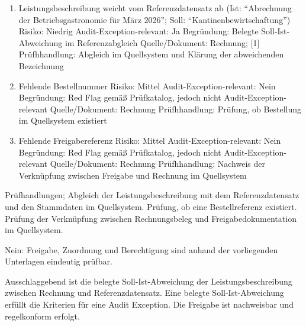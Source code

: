 \begin{enumerate}
    \item Leistungsbeschreibung weicht vom Referenzdatensatz ab (Ist: \enquote{Abrechnung der Betriebsgastronomie für März 2026}; Soll: \enquote{Kantinenbewirtschaftung})\newline
    Risiko: Niedrig\newline
    Audit-Exception-relevant: Ja\newline
    Begründung: Belegte Soll-Ist-Abweichung im Referenzabgleich\newline
    Quelle/Dokument: Rechnung;  [1]\newline
    Prüfhhandlung: Abgleich im Quellsystem und Klärung der abweichenden Bezeichnung
    \item Fehlende Bestellnummer\newline
    Risiko: Mittel\newline
    Audit-Exception-relevant: Nein\newline
    Begründung: Red Flag gemäß Prüfkatalog, jedoch nicht Audit-Exception-relevant\newline
    Quelle/Dokument: Rechnung\newline
    Prüfhhandlung: Prüfung, ob Bestellung im Quellsystem existiert
    \item Fehlende Freigabereferenz\newline
    Risiko: Mittel\newline
    Audit-Exception-relevant: Nein\newline
    Begründung: Red Flag gemäß Prüfkatalog, jedoch nicht Audit-Exception-relevant\newline
    Quelle/Dokument: Rechnung\newline
    Prüfhhandlung: Nachweis der Verknüpfung zwischen Freigabe und Rechnung im Quellsystem
\end{enumerate}

Prüfhandlungen; Abgleich der Leistungsbeschreibung mit dem Referenzdatensatz und den Stammdaten im Quellsystem. Prüfung, ob eine Bestellreferenz existiert. Prüfung der Verknüpfung zwischen Rechnungsbeleg und Freigabedokumentation im Quellsystem.

Nein: Freigabe, Zuordnung und Berechtigung sind anhand der vorliegenden Unterlagen eindeutig prüfbar.

Ausschlaggebend ist die belegte Soll-Ist-Abweichung der Leistungsbeschreibung zwischen Rechnung und Referenzdatensatz. Eine belegte Soll-Ist-Abweichung erfüllt die Kriterien für eine Audit Exception. Die Freigabe ist nachweisbar und regelkonform erfolgt.

